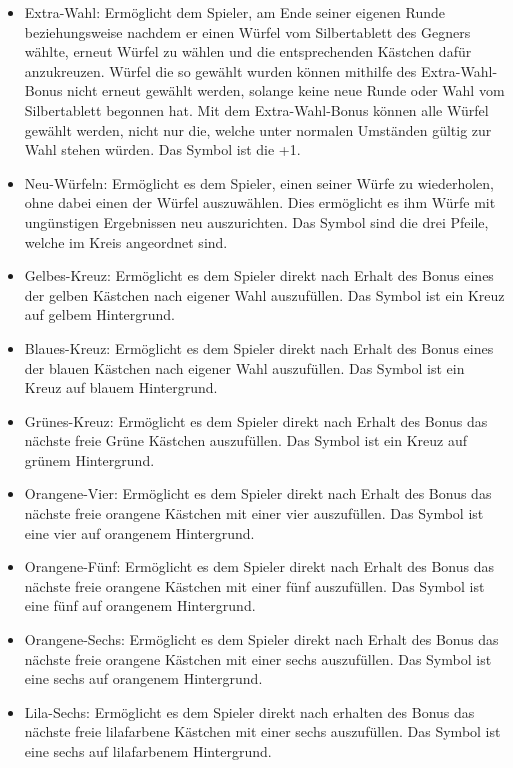 \begin{itemize}
\item Extra-Wahl: Ermöglicht dem Spieler, am Ende seiner eigenen Runde beziehungsweise nachdem er einen Würfel vom Silbertablett des Gegners wählte, erneut Würfel zu wählen und die entsprechenden Kästchen dafür anzukreuzen. Würfel die so gewählt wurden können mithilfe des Extra-Wahl-Bonus nicht erneut gewählt werden, solange keine neue Runde oder Wahl vom Silbertablett begonnen hat. Mit dem Extra-Wahl-Bonus können alle Würfel gewählt werden, nicht nur die, welche unter normalen Umständen gültig zur Wahl stehen würden. Das Symbol ist die +1.

\item Neu-Würfeln: Ermöglicht es dem Spieler, einen seiner Würfe zu wiederholen, ohne dabei einen der Würfel auszuwählen. Dies ermöglicht es ihm Würfe mit ungünstigen Ergebnissen neu auszurichten. Das Symbol sind die drei Pfeile, welche im Kreis angeordnet sind.

\item Gelbes-Kreuz: Ermöglicht es dem Spieler direkt nach Erhalt des Bonus eines der gelben Kästchen nach eigener Wahl auszufüllen. Das Symbol ist ein Kreuz auf gelbem Hintergrund.

\item Blaues-Kreuz: Ermöglicht es dem Spieler direkt nach Erhalt des Bonus eines der blauen Kästchen nach eigener Wahl auszufüllen. Das Symbol ist ein Kreuz auf blauem Hintergrund.

\item Grünes-Kreuz: Ermöglicht es dem Spieler direkt nach Erhalt des Bonus das nächste freie Grüne Kästchen auszufüllen. Das Symbol ist ein Kreuz auf grünem Hintergrund.

\item Orangene-Vier: Ermöglicht es dem Spieler direkt nach Erhalt des Bonus das nächste freie orangene Kästchen mit einer vier auszufüllen. Das Symbol ist eine vier auf orangenem Hintergrund.

\item Orangene-Fünf: Ermöglicht es dem Spieler direkt nach Erhalt des Bonus das nächste freie orangene Kästchen mit einer fünf auszufüllen. Das Symbol ist eine fünf auf orangenem Hintergrund.

\item Orangene-Sechs: Ermöglicht es dem Spieler direkt nach Erhalt des Bonus das nächste freie orangene Kästchen mit einer sechs auszufüllen. Das Symbol ist eine sechs auf orangenem Hintergrund.

\item Lila-Sechs: Ermöglicht es dem Spieler direkt nach erhalten des Bonus das nächste freie lilafarbene Kästchen mit einer sechs auszufüllen. Das Symbol ist eine sechs auf lilafarbenem Hintergrund. \\
\end{itemize}

